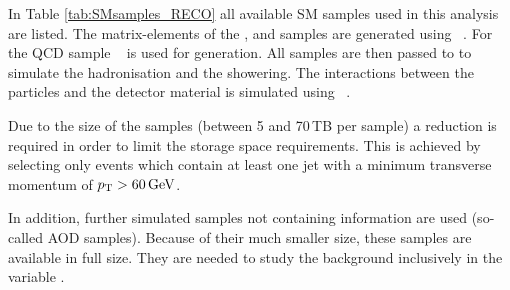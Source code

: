 In Table \ref{tab:SMsamples_RECO} all available SM samples used in this analysis are listed.
The matrix-elements of the \WJets, \ttbarJets and \ZlepJets samples are generated using ~\cite{bib:Madgraph_2014}. 
For the QCD sample \pythiaSix~\cite{bib:Pyhtia6_2006} is used for generation.
All samples are then passed to  to simulate the hadronisation and the showering. %
The interactions between the particles and the detector material is simulated using \geant~\cite{bib:Geant4_2003,bib:Geant4_2006}.


Due to the size of the samples (between 5 and 70\,TB per sample) a reduction is required in order to limit the storage space requirements.
This is achieved by selecting only events which contain at least one jet with a minimum transverse momentum of $p_{\text{T}}>60\,\text{Ge}\kern-0.06667em\text{V}$.

In addition, further simulated samples not containing \dedx information are used (so-called AOD samples).
Because of their much smaller size, these samples are available in full size.
They are needed to study the background inclusively in the variable \dedx.

